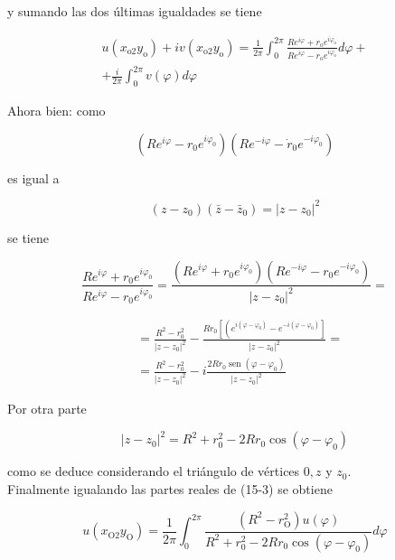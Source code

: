 \documentclass[10pt]{article}
\theoremstyle{plain}
\theoremstyle{definition}
\theoremstyle{remark}
\begin{document}
y sumando las dos últimas igualdades se tiene


\begin{gather*}
u\left(x_{\mathrm{o} 2} y_{\mathrm{o}}\right)+i v\left(x_{\mathrm{o} 2} y_{\mathrm{o}}\right)=\frac{1}{2 \pi} \int_{0}^{2 \pi} \frac{R e^{i \varphi}+r_{\mathrm{o}} e^{i \varphi_{\mathrm{o}}}}{R e^{i \varphi}-r_{\mathrm{o}} e^{i \varphi_{\mathrm{o}}}} d \varphi+ \\
+\frac{i}{2 \pi} \int_{0}^{2 \pi} v(\varphi) d \varphi \tag{$15\cdot3$}
\end{gather*}


Ahora bien: como

$$
\left(R e^{i \varphi}-r_{0} e^{i \varphi_{0}}\right)\left(R e^{-i \varphi}-\dot{r}_{0} e^{-i \varphi_{0}}\right)
$$

es igual a

$$
\left(z-z_{0}\right)\left(\bar{z}-\bar{z}_{0}\right)=\left|z-z_{0}\right|^{2}
$$

se tiene

$$
\frac{R e^{i \varphi}+r_{0} e^{i \varphi_{0}}}{R e^{i \varphi}-r_{0} e^{i \varphi_{0}}}=\frac{\left(R e^{i \varphi}+r_{0} e^{i \varphi_{0}}\right)\left(R e^{-i \varphi}-r_{0} e^{-i \varphi_{0}}\right)}{\left|z-z_{0}\right|^{2}}=
$$

$$
\begin{aligned}
& =\frac{R^{2}-r_{0}^{2}}{\left|z-z_{0}\right|^{2}}-\frac{R r_{0}\left[\left(e^{i\left(\varphi-\varphi_{0}\right)}-e^{-i\left(\varphi-\varphi_{0}\right)}\right]\right.}{\left|z-z_{0}\right|^{2}}= \\
& =\frac{R^{2}-r_{0}^{2}}{\left|z-z_{0}\right|^{2}}-i \frac{2 R r_{0} \operatorname{sen}\left(\varphi-\varphi_{0}\right)}{\left|z-z_{0}\right|^{2}}
\end{aligned}
$$

Por otra parte

$$
\left|z-z_{0}\right|^{2}=R^{2}+r_{0}^{2}-2 R r_{0} \cos \left(\varphi-\varphi_{0}\right)
$$

como se deduce considerando el triángulo de vértices $0, z$ y $z_{0}$.\\
Finalmente igualando las partes reales de (15-3) se obtiene


\begin{equation*}
u\left(x_{\mathrm{O} 2} y_{\mathrm{O}}\right)=\frac{1}{2 \pi} \int_{0}^{2 \pi} \frac{\left(R^{2}-r_{\mathrm{O}}^{2}\right) u(\varphi)}{R^{2}+r_{0}^{2}-2 R r_{0} \cos \left(\varphi-\varphi_{0}\right)} d \varphi \tag{15-4}
\end{equation*}
\end{document}
